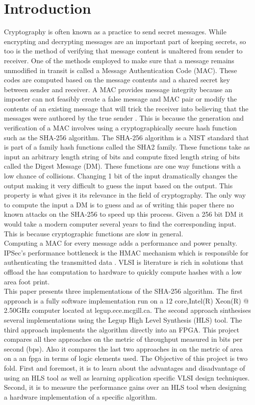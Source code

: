 \documentclass[conference]{IEEEtran}
\begin{document}
\section{Introduction} \label{introduction}
Cryptography is often known as a practice to send secret messages. While encrypting and decrypting messages are an important part of keeping secrets, so too is the method of verifying that message content is unaltered from sender to receiver. One of the methods employed to make sure that a message remains unmodified in transit is called a Message Authentication Code (MAC). These codes are computed based on the message contents and a shared secret key between sender and receiver. A MAC provides message integrity because an imposter can not feasibly create a false message and MAC pair or modify the contents of an existing message that will trick the receiver into believing that the messages were authored by the true sender \cite{schneier}. This is because the generation and verification of a MAC involves using a cryptographically secure hash function such as the SHA-256 algorithm. The SHA-256 algorithm is a NIST standard that is part of a family hash functions called the SHA2 family. These functions take as input an arbitrary length string of bits and compute fixed length string of bits called the Digest Message (DM). These functions are one way functions with a low chance of collisions. Changing 1 bit of the input dramatically changes the output making it very difficult to guess the input based on the output. This property is what gives it its relevance in the field of cryptography. The only way to compute the input a DM is to guess and as of writing this paper there no known attacks on the SHA-256 to speed up this process. Given a 256 bit DM it would take a modern computer several years to find the corresponding input. This is because cryptographic functions are slow in general.\\ Computing a MAC for every message adds a performance and power penalty. IPSec’s performance bottleneck is the HMAC mechanism which
is responsible for authenticating the transmitted data \cite{michail}. VLSI is literature is rich in solutions that offload the has computation to hardware to quickly compute hashes with a low area foot print. \\
This paper presents three implementations of the SHA-256 algorithm. The first approach is a fully software implementation run on a 12 core,Intel(R) Xeon(R) @ 2.50GHz computer located at legup.ece.mcgill.ca. The second approach sinthesises several implementations using the Legup High Level Synthesis (HLS) tool. The third approach implements the algorithm directly into an FPGA. This project compares all thee approaches on the metric of throughput measured in bits per second (bps). Also it compares the last two approaches in on the metric of area on a an fpga in terms of logic elements used. The Objective of this project is two fold. First and foremost, it is to learn about the advantages and disadvantage of using an HLS tool as well as learning application specific VLSI design techniques. Second, it is to measure the performance gains over an HLS tool when designing a hardware implementation of a specific algorithm.
\end{document}
